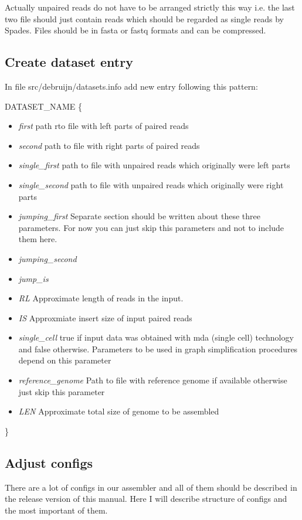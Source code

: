 \documentclass[a4paper,10pt]{article}
\begin{document}
Actually unpaired reads do not have to be arranged strictly this way i.e. the last two file should just contain reads 
which should be regarded as single reads by Spades.
Files should be in fasta or fastq formats and can be compressed.

\subsection{Create dataset entry}
In file src/debruijn/datasets.info add new entry following this pattern:

DATASET\_NAME
\{
\begin{itemize}
\item {\it first} path rto file with left parts of paired reads
\item{\it second} path to file with right parts of paired reads
\item{\it single\_first} path to file with unpaired reads which originally were left parts
\item{\it single\_second} path to file with unpaired reads which originally were right parts
\item{\it jumping\_first} Separate section should be written about these three parameters. For now you can just skip this parameters and not to include them here.
\item{\it jumping\_second}
\item{\it jump\_is} 
\item{\it RL} Approximate length of reads in the input.
\item{\it IS} Approxmiate insert size of input paired reads
\item{\it single\_cell} true if input data was obtained with mda (single cell) technology and false otherwise. Parameters to be used in graph simplification procedures depend on this parameter
\item{\it reference\_genome} Path to file with reference genome if available otherwise just skip this parameter
\item{\it LEN} Approximate total size of genome to be assembled
\end{itemize}
\}

\subsection{Adjust configs}
There are a lot of configs in our assembler and all of them should be described in the release version of this manual. Here I will describe structure of configs and the most important of them.
\end{document}

